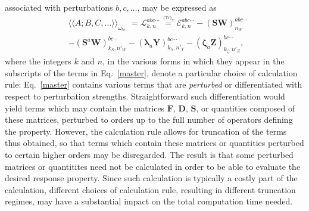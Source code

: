 \documentclass[%
 reprint,
 amsmath,amssymb,
 aps,
]{revtex4-1}
\begin{document}
associated with perturbations $b, c, \ldots$, may be expressed as
\begin{equation}\label{master}
\begin{split}
& \langle \langle A ; B, C, \ldots \rangle \rangle_{\omega_{bc\cdots}} = \mathcal{L}_{k,n}^{abc\cdots} \stackrel{\,^{\{\mathrm{Tr}\}_T}}{=}
 \mathcal{E}_{k,n}^{abc\cdots} - (\mathbf{SW})_{n_{W}}^{abc\cdots} \\ & - (\mathbf{S}^{a}\mathbf{W})_{k_{S},n'_{W}}^{bc\cdots} - (\mathbf{\lambda}_{a}\mathbf{Y})_{k_{\lambda},n'_{Y}}^{bc\cdots} - (\mathbf{\zeta}_{a}\mathbf{Z})_{k_{\zeta},n'_{Z}}^{bc\cdots}\text{,}
\end{split}
\end{equation}
where the integers $k$ and $n$, in the various forms in which they appear in
the subscripts of the terms in Eq.~\eqref{master}, denote a particular choice
of calculation rule: Eq.~\eqref{master} contains various terms that are
\textit{perturbed} or differentiated with respect to perturbation strengths.
Straightforward such differentiation would yield terms which may contain the
matrices $\mathbf{F}$, $\mathbf{D}$, $\mathbf{S}$, or quantities composed of
these matrices, perturbed to orders up to the full number of operators defining
the property. However, the calculation rule allows for truncation of the terms
thus obtained, so that terms which contain these matrices or quantities
perturbed to certain higher orders may be disregarded. The result is that some
perturbed matrices or quantitites need not be calculated in order to be able to
evaluate the desired response property. Since such calculation is typically a
costly part of the calculation, different choices of calculation rule,
resulting in different truncation regimes, may have a substantial impact on the
total computation time needed.
\end{document}
